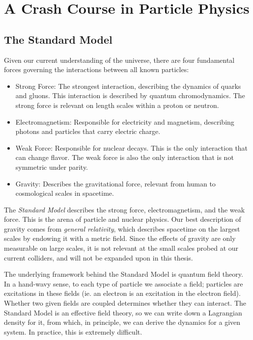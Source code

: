 \documentclass[../main.tex]{subfiles}
\begin{document}
\section{A Crash Course in Particle Physics}

\subsection{The Standard Model}
Given our current understanding of the universe, there are four fundamental forces governing the interactions between all known particles: 

\begin{itemize}
    \item Strong Force: The strongest interaction, describing the dynamics of quarks and gluons. This interaction is described by quantum chromodynamics. The strong force is relevant on length scales within a proton or neutron. 
    \item Electromagnetism: Responsible for electricity and magnetism, describing photons and particles that carry electric charge. 
    \item Weak Force: Responsible for nuclear decays. This is the only interaction that can change flavor. The weak force is also the only interaction that is not symmetric under parity. 
    \item Gravity: Describes the gravitational force, relevant from human to cosmological scales in spacetime. 
\end{itemize}

The \textit{Standard Model} describes the strong force, electromagnetism, and the weak force. This is the arena of particle and nuclear physics. Our best description of gravity comes from \textit{general relativity}, which describes spacetime on the largest scales by endowing it with a metric field. Since the effects of gravity are only measurable on large scales, it is not relevant at the small scales probed at our current colliders, and will not be expanded upon in this thesis. 

The underlying framework behind the Standard Model is quantum field theory. In a hand-wavy sense, to each type of particle we associate a field; particles are excitations in these fields (ie. an electron is an excitation in the electron field). Whether two given fields are coupled determines whether they can interact. The Standard Model is an effective field theory, so we can write down a Lagrangian density for it, from which, in principle, we can derive the dynamics for a given system. In practice, this is extremely difficult.   
\end{document}

